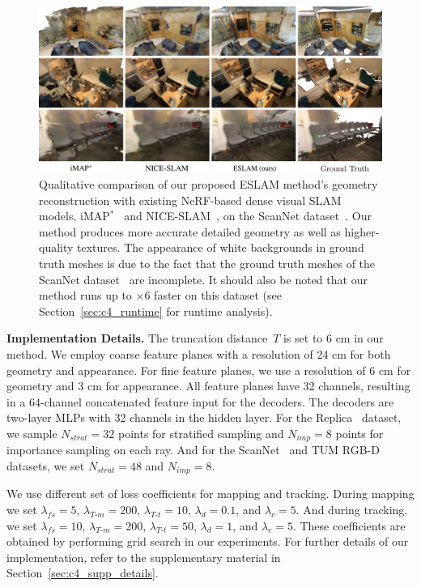 \begin{figure}[t]
    \begin{center}
        \includegraphics[width=1.0\linewidth]{images/chapter4/figures/Fig5.jpg}
    \end{center}
    \caption{Qualitative comparison of our proposed ESLAM method's geometry reconstruction with existing NeRF-based dense visual SLAM models, iMAP$^*$~\citep{sucar2021imap} and NICE-SLAM~\citep{zhu2022nice}, on the ScanNet dataset~\citep{dai2017scannet}. Our method produces more accurate detailed geometry as well as higher-quality textures. The appearance of white backgrounds in ground truth meshes is due to the fact that the ground truth meshes of the ScanNet dataset~\citep{dai2017scannet} are incomplete. It should also be noted that our method runs up to $\times$6 faster on this dataset (see Section~\ref{sec:c4_runtime} for runtime analysis).}
    \label{fig:c4_qualitative_scannet}
\end{figure}

\vspace{1ex}
\noindent\textbf{Implementation Details.} The truncation distance~$T$ is set to 6 cm in our method. We employ coarse feature planes with a resolution of 24 cm for both geometry and appearance. For fine feature planes, we use a resolution of 6 cm for geometry and 3 cm for appearance. All feature planes have 32 channels, resulting in a 64-channel concatenated feature input for the decoders. The decoders are two-layer MLPs with 32 channels in the hidden layer. For the Replica~\citep{replica19arxiv} dataset, we sample $N_{strat}=32$ points for stratified sampling and $N_{imp}=8$ points for importance sampling on each ray. And for the ScanNet~\citep{dai2017scannet} and TUM RGB-D~\citep{sturm2012benchmark} datasets, we set $N_{strat}=48$ and $N_{imp}=8$.

We use different set of loss coefficients for mapping and tracking. During mapping we set $\lambda_{fs}=5$, $\lambda_{T\text{-}m}=200$, $\lambda_{T\text{-}t}=10$, $\lambda_{d}=0.1$, and $\lambda_{c}=5$. And during tracking, we set $\lambda_{fs}=10$, $\lambda_{T\text{-}m}=200$, $\lambda_{T\text{-}t}=50$, $\lambda_{d}=1$, and $\lambda_{c}=5$. These coefficients are obtained by performing grid search in our experiments. For further details of our implementation, refer to the supplementary material in Section~\ref{sec:c4_supp_details}.


